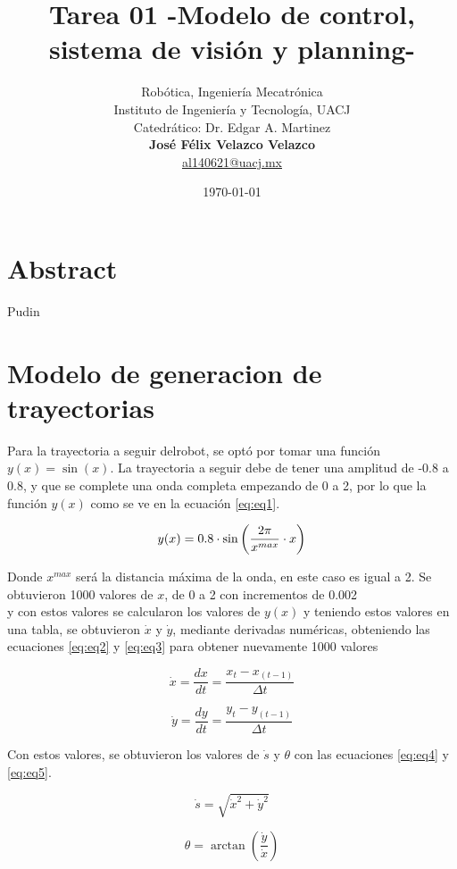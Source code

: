 \documentclass[spanish,10pt,letterpaper, twocolumn]{article}
\title{Tarea 01 -Modelo de control, sistema de visi\'on y planning-}
\author{Rob\'otica, Ingenier\'ia Mecatr\'onica\\
Instituto de Ingenier\'ia y Tecnolog\'ia, UACJ\\
Catedr\'atico: Dr. Edgar A. Martinez\\
\textbf{Jos\'e F\'elix Velazco Velazco}\\ 
\url{al140621@uacj.mx}
}
\date{\today}
\begin{document}
\maketitle
\section{Abstract}
Pudin
\section{Modelo de generacion de trayectorias}
Para la trayectoria a seguir delrobot, se opt\'o por tomar una funci\'on $y(x)=\sin(x)$. La trayectoria a seguir debe de tener una amplitud de -0.8 a 0.8, y que se complete una onda completa empezando de 0 a 2, por lo que la funci\'on $y(x)$ como se ve en la ecuaci\'on \eqref{eq:eq1}.

\begin{equation}
{
	\label{eq:eq1}
	y(x)=0.8\cdot \sin\left( \frac{2\pi}{x^{max}}\cdot x\right) 
}
\end{equation}

Donde $x^{max}$ ser\'a la distancia m\'axima de la onda, en este caso es igual a 2.
Se obtuvieron 1000 valores de $x$, de 0 a 2 con incrementos de 0.002\\
y con estos valores se calcularon los valores de $y(x)$ y teniendo estos valores en una tabla, se obtuvieron $\dot{x}$ y $\dot{y}$, mediante derivadas num\'ericas, obteniendo las ecuaciones \eqref{eq:eq2} y \eqref{eq:eq3} para obtener nuevamente 1000 valores

\begin{equation}
	\label{eq:eq2}
	\dot{x}=\frac{dx}{dt}=\frac{x_t-x_{(t-1)}}{\Delta t}
\end{equation} 

\begin{equation}
	\label{eq:eq3}
	\dot{y}=\frac{dy}{dt}=\frac{y_t-y_{(t-1)}}{\Delta t}
\end{equation} 

Con estos valores, se obtuvieron los valores de $\dot{s}$ y $\theta$ con las ecuaciones \eqref{eq:eq4} y \eqref{eq:eq5}.

\begin{equation}
	\label{eq:eq4}
	\dot{s}=\sqrt{\dot{x}^2+\dot{y}^2}
\end{equation} 

\begin{equation}
	\label{eq:eq5}
	\theta=\arctan\left(\frac{\dot{y}}{\dot{x}}\right)	
\end{equation}
\end{document}
